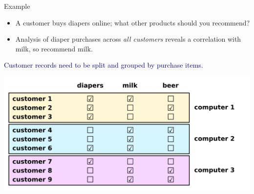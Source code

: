 \documentclass{beamer}
\begin{document}
\begin{frame}{}
\begin{block}{Example}
\begin{itemize}
\item A customer buys diapers online; what other products should you recommend?
\item Analysis of diaper purchases across {\it all customers} reveals a correlation with milk, so recommend milk.
\end{itemize}
\end{block}

\vfill
\textcolor{darkblue}{Customer records need to be split and grouped by purchase items.}

\begin{center}
\includegraphics[width=0.9\linewidth]{distributed_data.png}
\end{center}
\end{frame}
\end{document}
